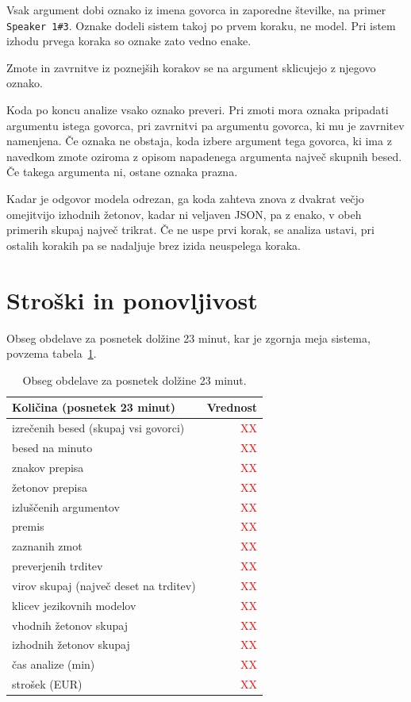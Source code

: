 \documentclass[a4paper, 12pt]{book}
\begin{document}
\label{ssec:arg-id}

Vsak argument dobi oznako iz imena govorca in zaporedne številke, na primer
\texttt{Speaker~1\#3}. Oznake dodeli sistem takoj po prvem koraku, ne model. Pri
istem izhodu prvega koraka so oznake zato vedno enake. 

Zmote in zavrnitve iz poznejših korakov se na argument sklicujejo z njegovo oznako.

\label{ssec:povezovanje}
Koda po koncu analize vsako oznako preveri. Pri zmoti mora oznaka pripadati argumentu istega govorca, pri zavrnitvi pa argumentu govorca, ki mu je zavrnitev namenjena. Če oznaka ne obstaja, koda izbere argument tega govorca, ki ima z navedkom zmote oziroma z opisom napadenega argumenta največ skupnih besed. Če takega argumenta ni, ostane oznaka prazna.

Kadar je odgovor modela odrezan, ga koda zahteva znova z dvakrat večjo omejitvijo izhodnih žetonov, kadar ni veljaven JSON, pa z enako, v obeh primerih skupaj največ trikrat. Če ne uspe prvi korak, se analiza ustavi, pri ostalih korakih pa se nadaljuje brez izida neuspelega koraka. 

\section{Stroški in ponovljivost}
\label{sec:stroski}

Obseg obdelave za posnetek dolžine 23 minut, kar je zgornja meja sistema,
povzema tabela~\ref{tbl:obseg}.

\begin{table}[H]
\centering
\small
{}
\begin{tabular}{@{}p{}r@{}}
\toprule
Količina (posnetek 23 minut) & Vrednost \\
\midrule
izrečenih besed (skupaj vsi govorci) & \textcolor{red}{XX} \\
besed na minuto & \textcolor{red}{XX} \\
znakov prepisa & \textcolor{red}{XX} \\
žetonov prepisa & \textcolor{red}{XX} \\
\midrule
izluščenih argumentov & \textcolor{red}{XX} \\
premis & \textcolor{red}{XX} \\
zaznanih zmot & \textcolor{red}{XX} \\
preverjenih trditev & \textcolor{red}{XX} \\
virov skupaj (največ deset na trditev) & \textcolor{red}{XX} \\
\midrule
klicev jezikovnih modelov & \textcolor{red}{XX} \\
vhodnih žetonov skupaj & \textcolor{red}{XX} \\
izhodnih žetonov skupaj & \textcolor{red}{XX} \\
čas analize (min) & \textcolor{red}{XX} \\
strošek (EUR) & \textcolor{red}{XX} \\
\bottomrule
\end{tabular}
\caption{Obseg obdelave za posnetek dolžine 23 minut.}
\label{tbl:obseg}
\end{table}
\end{document}
